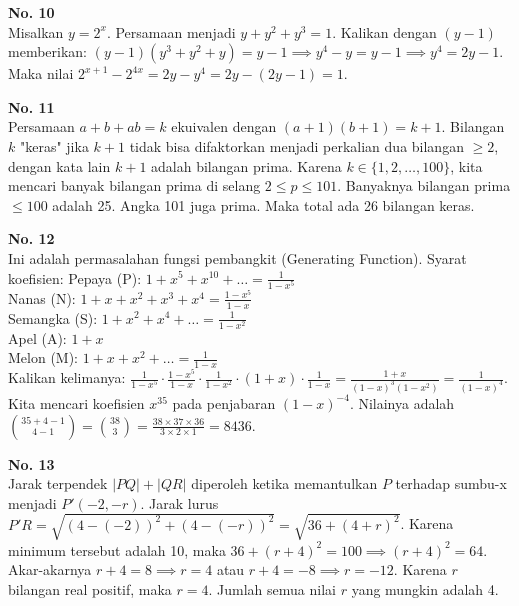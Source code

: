 \documentclass[11pt, a4paper]{article}
\begin{document}
\textbf{No. 10}\\
Misalkan $y = 2^x$. Persamaan menjadi $y + y^2 + y^3 = 1$.
Kalikan dengan $(y-1)$ memberikan: $(y-1)(y^3+y^2+y) = y-1 \implies y^4 - y = y - 1 \implies y^4 = 2y - 1$.
Maka nilai $2^{x+1} - 2^{4x} = 2y - y^4 = 2y - (2y - 1) = 1$.

\textbf{No. 11}\\
Persamaan $a+b+ab = k$ ekuivalen dengan $(a+1)(b+1) = k+1$.
Bilangan $k$ "keras" jika $k+1$ tidak bisa difaktorkan menjadi perkalian dua bilangan $\ge 2$, dengan kata lain $k+1$ adalah bilangan prima.
Karena $k \in \{1, 2, \dots, 100\}$, kita mencari banyak bilangan prima di selang $2 \le p \le 101$.
Banyaknya bilangan prima $\le 100$ adalah 25. Angka 101 juga prima. Maka total ada 26 bilangan keras.

\textbf{No. 12}\\
Ini adalah permasalahan fungsi pembangkit (Generating Function). Syarat koefisien:
Pepaya (P): $1 + x^5 + x^{10} + \dots = \frac{1}{1-x^5}$ \\
Nanas (N): $1 + x + x^2 + x^3 + x^4 = \frac{1-x^5}{1-x}$ \\
Semangka (S): $1 + x^2 + x^4 + \dots = \frac{1}{1-x^2}$ \\
Apel (A): $1 + x$ \\
Melon (M): $1 + x + x^2 + \dots = \frac{1}{1-x}$ \\
Kalikan kelimanya: $\frac{1}{1-x^5} \cdot \frac{1-x^5}{1-x} \cdot \frac{1}{1-x^2} \cdot (1+x) \cdot \frac{1}{1-x} = \frac{1+x}{(1-x)^3 (1-x^2)} = \frac{1}{(1-x)^4}$.
Kita mencari koefisien $x^{35}$ pada penjabaran $(1-x)^{-4}$.
Nilainya adalah $\binom{35+4-1}{4-1} = \binom{38}{3} = \frac{38 \times 37 \times 36}{3 \times 2 \times 1} = 8436$.

\textbf{No. 13}\\
Jarak terpendek $|PQ| + |QR|$ diperoleh ketika memantulkan $P$ terhadap sumbu-x menjadi $P'(-2, -r)$.
Jarak lurus $P'R = \sqrt{(4 - (-2))^2 + (4 - (-r))^2} = \sqrt{36 + (4+r)^2}$.
Karena minimum tersebut adalah 10, maka $36 + (r+4)^2 = 100 \implies (r+4)^2 = 64$.
Akar-akarnya $r+4 = 8 \implies r=4$ atau $r+4 = -8 \implies r = -12$.
Karena $r$ bilangan real positif, maka $r = 4$. Jumlah semua nilai $r$ yang mungkin adalah 4.

\begin{center}
\end{center}
\end{document}
